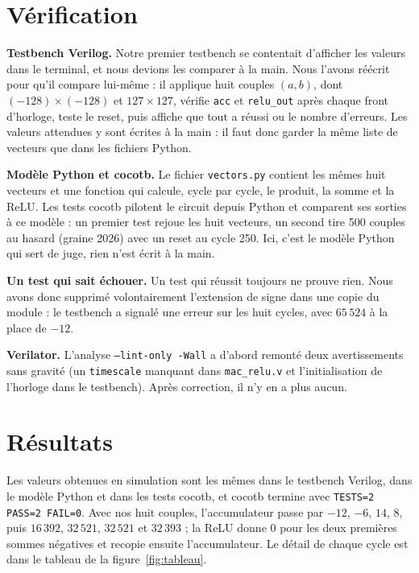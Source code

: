 \documentclass[11pt,a4paper]{article}
\begin{document}
\section{Vérification}

\textbf{Testbench Verilog.} Notre premier testbench se contentait d'afficher les
valeurs dans le terminal, et nous devions les comparer à la main. Nous l'avons
réécrit pour qu'il compare lui-même : il applique huit couples $(a,b)$, dont
$(-128)\times(-128)$ et $127\times127$, vérifie \texttt{acc} et \texttt{relu\_out}
après chaque front d'horloge, teste le reset, puis affiche que tout a réussi ou le
nombre d'erreurs. Les valeurs attendues y sont écrites à la main : il faut donc
garder la même liste de vecteurs que dans les fichiers Python.

\textbf{Modèle Python et cocotb.} Le fichier \texttt{vectors.py} contient les
mêmes huit vecteurs et une fonction qui calcule, cycle par cycle, le produit, la
somme et la ReLU. Les tests cocotb pilotent le circuit depuis Python et comparent
ses sorties à ce modèle : un premier test rejoue les huit vecteurs, un second tire
500 couples au hasard (graine 2026) avec un reset au cycle 250. Ici, c'est le
modèle Python qui sert de juge, rien n'est écrit à la main.

\textbf{Un test qui sait échouer.} Un test qui réussit toujours ne prouve rien.
Nous avons donc supprimé volontairement l'extension de signe dans une copie du
module : le testbench a signalé une erreur sur les huit cycles, avec $65\,524$ à la
place de $-12$.

\textbf{Verilator.} L'analyse \texttt{--lint-only -Wall} a d'abord remonté deux
avertissements sans gravité (un \texttt{timescale} manquant dans
\texttt{mac\_relu.v} et l'initialisation de l'horloge dans le testbench). Après
correction, il n'y en a plus aucun.

\section{Résultats}

Les valeurs obtenues en simulation sont les mêmes dans le testbench Verilog, dans
le modèle Python et dans les tests cocotb, et cocotb termine avec
\texttt{TESTS=2 PASS=2 FAIL=0}. Avec nos huit couples, l'accumulateur passe par
$-12$, $-6$, $14$, $8$, puis $16\,392$, $32\,521$, $32\,521$ et $32\,393$ ; la ReLU
donne $0$ pour les deux premières sommes négatives et recopie ensuite l'accumulateur.
Le détail de chaque cycle est dans le tableau de la figure~\ref{fig:tableau}.
\end{document}
